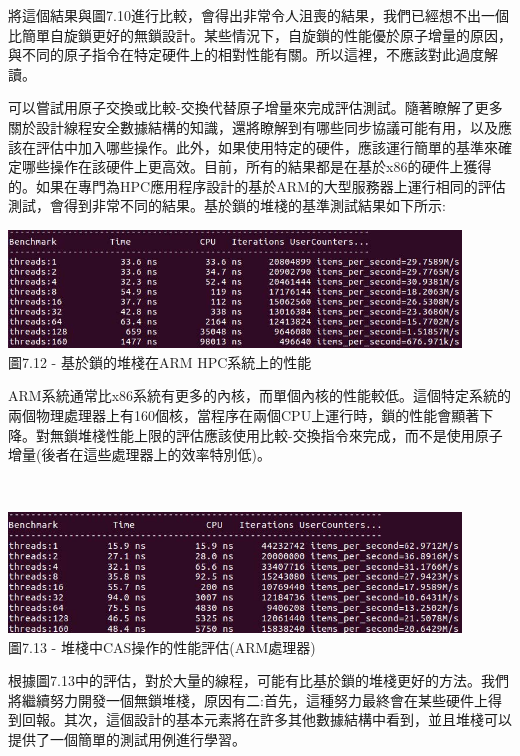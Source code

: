 將這個結果與圖7.10進行比較，會得出非常令人沮喪的結果，我們已經想不出一個比簡單自旋鎖更好的無鎖設計。某些情況下，自旋鎖的性能優於原子增量的原因，與不同的原子指令在特定硬件上的相對性能有關。所以這裡，不應該對此過度解讀。

可以嘗試用原子交換或比較-交換代替原子增量來完成評估測試。隨著瞭解了更多關於設計線程安全數據結構的知識，還將瞭解到有哪些同步協議可能有用，以及應該在評估中加入哪些操作。此外，如果使用特定的硬件，應該運行簡單的基準來確定哪些操作在該硬件上更高效。目前，所有的結果都是在基於x86的硬件上獲得的。如果在專門為HPC應用程序設計的基於ARM的大型服務器上運行相同的評估測試，會得到非常不同的結果。基於鎖的堆棧的基準測試結果如下所示:

\begin{center}
\includegraphics[width=0.9\textwidth]{content/2/chapter7/images/12.jpg}\\
圖7.12 - 基於鎖的堆棧在ARM HPC系統上的性能
\end{center}

ARM系統通常比x86系統有更多的內核，而單個內核的性能較低。這個特定系統的兩個物理處理器上有160個核，當程序在兩個CPU上運行時，鎖的性能會顯著下降。對無鎖堆棧性能上限的評估應該使用比較-交換指令來完成，而不是使用原子增量(後者在這些處理器上的效率特別低)。

\hspace*{\fill} \\ %
\begin{center}
\includegraphics[width=0.9\textwidth]{content/2/chapter7/images/13.jpg}\\
圖7.13 - 堆棧中CAS操作的性能評估(ARM處理器)
\end{center}

根據圖7.13中的評估，對於大量的線程，可能有比基於鎖的堆棧更好的方法。我們將繼續努力開發一個無鎖堆棧，原因有二:首先，這種努力最終會在某些硬件上得到回報。其次，這個設計的基本元素將在許多其他數據結構中看到，並且堆棧可以提供了一個簡單的測試用例進行學習。


